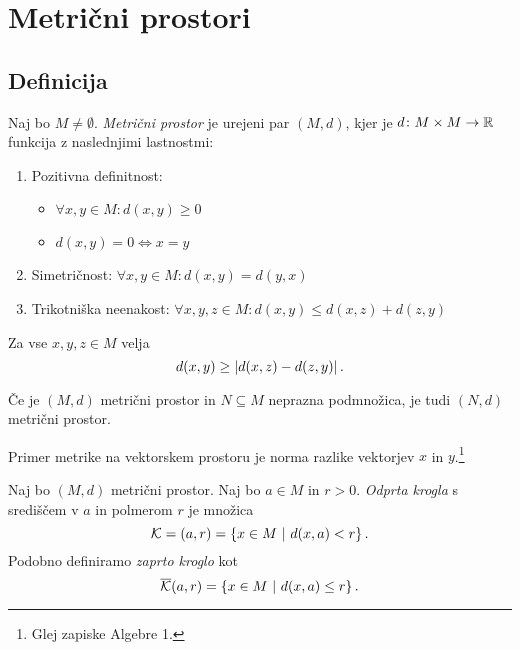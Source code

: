 \documentclass[12pt, a4paper]{article}
\begin{document}
\newpage

\section{Metrični prostori}

\subsection{Definicija}

\begin{okvir}
\begin{definicija}
Naj bo $M\ne\emptyset$. \emph{Metrični prostor} je urejeni par $(M,d)$, kjer je $d\colon M\times M\to\mathbb{R}$ funkcija z naslednjimi lastnostmi:

\begin{enumerate}
\item Pozitivna definitnost:

\begin{itemize}
\item $\forall x,y\in M\colon d(x,y)\geq 0$
\item $d(x,y)=0\iff x=y$
\end{itemize}

\item Simetričnost: $\forall x,y\in M\colon d(x,y)=d(y,x)$
\item Trikotniška neenakost: $\forall x,y,z\in M\colon d(x,y)\leq d(x,z)+d(z,y)$
\end{enumerate}
\end{definicija}
\end{okvir}

\begin{opomba}
Za vse $x,y,z\in M$ velja
\[
d(x,y)\geq\left\lvert d(x,z)-d(z,y)\right\rvert.
\]
\end{opomba}

\begin{opomba}
Če je $(M,d)$ metrični prostor in $N\subseteq M$ neprazna podmnožica, je tudi $(N,d)$ metrični prostor.
\end{opomba}

\begin{opomba}
Primer metrike na vektorskem prostoru je norma razlike vektorjev $x$ in $y$.\footnote{Glej zapiske Algebre 1.}
\end{opomba}

\begin{definicija}
Naj bo $(M,d)$ metrični prostor. Naj bo $a\in M$ in $r>0$. \emph{Odprta krogla} s središčem v $a$ in polmerom $r$ je množica
\[
\mathcal{K}=(a,r)=\left\{x\in M~\middle\vert~d(x,a)<r\right\}.
\]
Podobno definiramo \emph{zaprto kroglo} kot
\[
\overline{\mathcal{K}}(a,r)=\left\{x\in M~\middle\vert~d(x,a)\leq r\right\}.
\]
\end{definicija}
\end{document}
